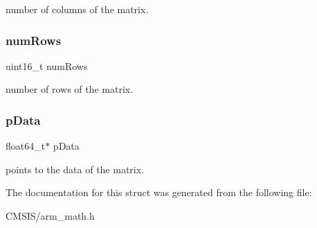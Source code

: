 number of columns of the matrix. \mbox{\label{structarm__matrix__instance__f64_a1bcf80ccdc2acc29198f1592ae300390}} 
\subsubsection{\texorpdfstring{numRows}{numRows}}
{\footnotesize\ttfamily uint16\+\_\+t num\+Rows}

number of rows of the matrix. \mbox{\label{structarm__matrix__instance__f64_aa7a4c9839c31e933360ef3a3167b9877}} 
\subsubsection{\texorpdfstring{pData}{pData}}
{\footnotesize\ttfamily float64\+\_\+t$\ast$ p\+Data}

points to the data of the matrix. 

The documentation for this struct was generated from the following file\+:\begin{DoxyCompactItemize}
\item 
C\+M\+S\+I\+S/arm\+\_\+math.\+h\end{DoxyCompactItemize}
